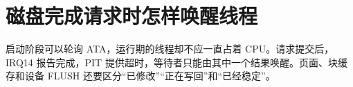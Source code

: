 \chapter{磁盘完成请求时怎样唤醒线程}

启动阶段可以轮询 ATA，运行期的线程却不应一直占着 CPU。请求提交后，IRQ14
报告完成，PIT 提供超时，等待者只能由其中一个结果唤醒。页面、块缓存和设备
FLUSH 还要区分“已修改”“正在写回”和“已经稳定”。





